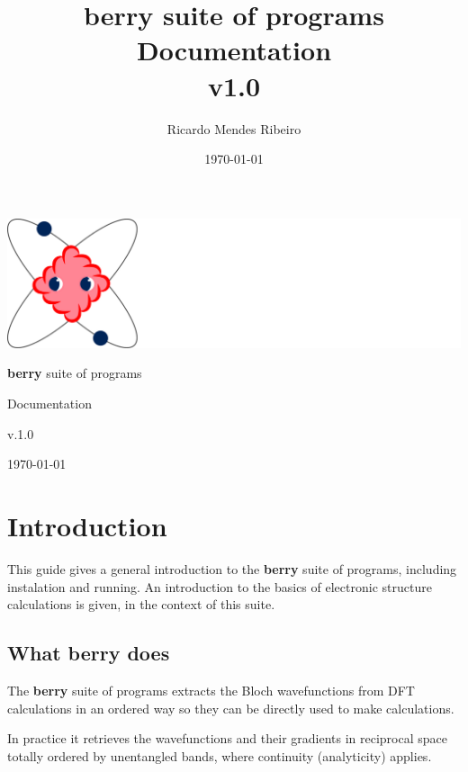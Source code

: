 \documentclass[a4paper,12pt]{report}
\title{{\bf berry} suite of programs\\
\large Documentation \\
v1.0}
\author{Ricardo Mendes Ribeiro}
\date{\today}
\begin{document}
\begin{titlepage}
 \begin{center}
 \includegraphics[scale=0.3,keepaspectratio=true]{figures/BerryLogo.png}
\vspace*{2cm}

  \begin{Huge}{\bf berry} suite of programs  \end{Huge}
  \vspace*{1cm}

 \begin{LARGE}Documentation              \end{LARGE}
  \vspace*{1cm}

\begin{Huge}v.1.0\end{Huge}
  \vspace*{0.5cm}

\today
 \end{center}
\end{titlepage}

\tableofcontents

\chapter{Introduction}\label{ch:introduction}

 This guide gives a general introduction to the \textbf{berry} suite of programs, including instalation and running.
 An introduction to the basics of electronic structure calculations is given, in the context of this suite.


\section{What \textbf{berry} does}

The \textbf{berry} suite of programs extracts the Bloch wavefunctions from DFT calculations in an ordered way
so they can be directly used to make calculations.

In practice it retrieves the wavefunctions and their gradients in reciprocal space totally ordered
by unentangled bands, where continuity (analyticity) applies.
\end{document}
